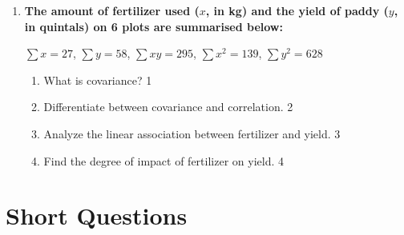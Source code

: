 \documentclass[a4paper,oneside]{book}
\begin{document}
\begin{enumerate}
\begin{enumerate}
    \item
    Estimate the regression coefficient of x on y. Is this model realistic? Explain. \hfill 4
\end{enumerate}
\item
\textbf{The amount of fertilizer used ($x$, in kg) and the yield of paddy ($y$, in quintals) on 6 plots are summarised below:}
\begin{center}
$\sum x = 27$, $\sum y = 58$, $\sum xy = 295$, $\sum x^2 = 139$, $\sum y^2 = 628$
\end{center}
\begin{enumerate}
  \item What is covariance? \hfill 1
  \item Differentiate between covariance and correlation. \hfill 2
  \item Analyze the linear association between fertilizer and yield. \hfill 3
  \item Find the degree of impact of fertilizer on yield. \hfill 4
\end{enumerate}

\end{enumerate}

\section{Short Questions}
\end{document}
